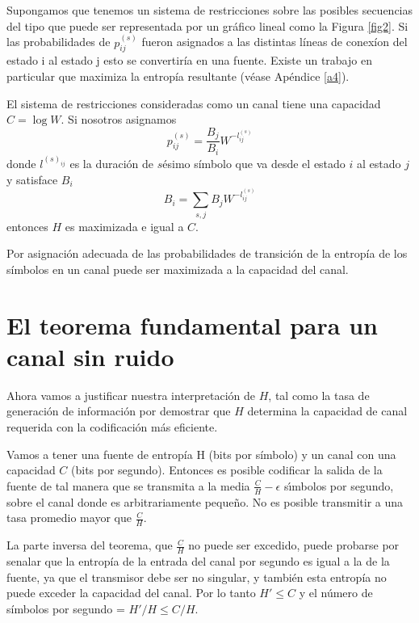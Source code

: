 Supongamos que tenemos un sistema de restricciones sobre las posibles
secuencias del tipo que puede ser representada por un gr\'afico lineal
como la Figura \ref{fig2}. Si las probabilidades de $p^{(s)}_{ij}$
fueron asignados a las distintas l\'ineas de conex\'ion del estado i
al estado j esto se convertir\'ia en una fuente.  Existe un trabajo en
particular que maximiza la entrop\'ia resultante (v\'ease Ap\'endice
\ref{a4}).

\begin{theorem}
El sistema de restricciones consideradas como un canal tiene una
capacidad $C=\log W$.  Si nosotros asignamos
\begin{equation}
p^{(s)}_{ij}=\frac{B_{j}}{B_{i}}W^{-l^{(s)}_{ij}}
\end{equation}
donde $l^{(s)_{ij}}$ es la duraci\'on de $s$\'{e}simo s\'imbolo que va
desde el estado $i$ al estado $j$ y satisface $B_{i}$
\begin{equation}
B_{i}=\sum_{s,j} B_{j}W^{-l^{(s)}_{ij}}
\end{equation}
entonces $H$ es maximizada e igual a $C$.
\end{theorem}

Por asignaci\'on adecuada de las probabilidades de transici\'on de la
entrop\'ia de los s\'imbolos en un canal puede ser maximizada a la
capacidad del canal.

\section{El teorema fundamental para un canal sin ruido}

Ahora vamos a justificar nuestra interpretaci\'on de $H$, tal como la
tasa de generaci\'on de informaci\'on por demostrar que $H$ determina la
capacidad de canal requerida con la codificaci\'on m\'as eficiente.

\begin{theorem}
Vamos a tener una fuente de entrop\'ia H (bits por s\'imbolo) y un
canal con una capacidad $C$ (bits por segundo). Entonces es posible
codificar la salida de la fuente de tal manera que se transmita a la
media $\frac{C}{H}-\epsilon$ s\'{\i}mbolos por segundo, sobre el canal
donde es arbitrariamente peque\~{n}o. No es posible transmitir a una
tasa promedio mayor que $\frac{C}{H}$.
\label{t9}
\end{theorem}

La parte inversa del teorema, que $\frac{C}{H}$ no puede ser excedido,
puede probarse por senalar que la entrop\'ia de la entrada del canal
por segundo es igual a la de la fuente, ya que el transmisor debe ser
no singular, y tambi\'en esta entrop\'ia no puede exceder la capacidad
del canal. Por lo tanto $H' \leq C$ y el n\'umero de
s\'imbolos por segundo = $H'/ H \leq C/H$. 

